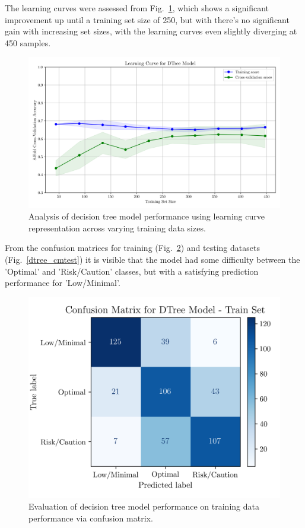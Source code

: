 \documentclass[conference]{IEEEtran}
\begin{document}
The learning curves were assessed from Fig.~\ref{dtree_lcurve}, which shows a significant improvement up until a training set size of 250, but with there's no significant gain with increasing set sizes, with the learning curves even slightly diverging at 450 samples.

\begin{figure}[H]
    \centering
    \includegraphics[width=1\linewidth]{assets/DTREE_LearningCurve.png}
    \caption{Analysis of decision tree model performance using learning curve representation across varying training data sizes.}
    \label{dtree_lcurve}
\end{figure} %

From the confusion matrices for training (Fig.~\ref{dtree_cmtrain}) and testing datasets (Fig.~\ref{dtree_cmtest}) it is visible that the model had some difficulty between the 'Optimal' and 'Risk/Caution' classes, but with a satisfying prediction performance for 'Low/Minimal'.

\begin{figure}[H]
    \centering
    \includegraphics[width=1\linewidth]{assets/DTREE_ConfusionMatrixTrain.png}
    \caption{Evaluation of decision tree model performance on training data performance via confusion matrix.}
    \label{dtree_cmtrain}
\end{figure} %
\end{document}
